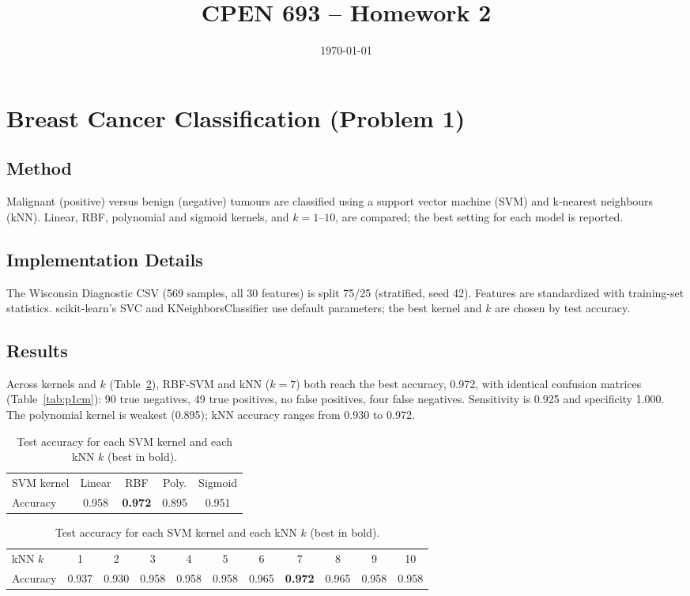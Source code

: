 \documentclass[11pt]{article}
\title{CPEN 693 -- Homework 2}
\author{}
\date{\today}
\begin{document}
\maketitle

\section{Breast Cancer Classification (Problem 1)}

\subsection*{Method}
Malignant (positive) versus benign (negative) tumours are classified using a support vector machine (SVM) and k-nearest neighbours (kNN). Linear, RBF, polynomial and sigmoid kernels, and $k=1$--$10$, are compared; the best setting for each model is reported.

\subsection*{Implementation Details}
The Wisconsin Diagnostic CSV (569 samples, all 30 features) is split 75/25 (stratified, seed 42). Features are standardized with training-set statistics. scikit-learn's SVC and KNeighborsClassifier use default parameters; the best kernel and $k$ are chosen by test accuracy.

\subsection*{Results}
Across kernels and $k$ (Table~\ref{tab:p1sweep}), RBF-SVM and kNN ($k=7$) both reach the best accuracy, 0.972, with identical confusion matrices (Table~\ref{tab:p1cm}): 90 true negatives, 49 true positives, no false positives, four false negatives. Sensitivity is 0.925 and specificity 1.000. The polynomial kernel is weakest (0.895); kNN accuracy ranges from 0.930 to 0.972.

\begin{table}[H]
\centering
\caption{Test accuracy for each SVM kernel and each kNN $k$ (best in bold).}
\label{tab:p1sweep}
\begin{tabular}{lcccc}
\toprule
SVM kernel & Linear & RBF & Poly. & Sigmoid\\
Accuracy & 0.958 & \textbf{0.972} & 0.895 & 0.951\\
\bottomrule
\end{tabular}

\vspace{6pt}
\begin{tabular}{lcccccccccc}
\toprule
kNN $k$ & 1 & 2 & 3 & 4 & 5 & 6 & 7 & 8 & 9 & 10\\
Accuracy & 0.937 & 0.930 & 0.958 & 0.958 & 0.958 & 0.965 & \textbf{0.972} & 0.965 & 0.958 & 0.958\\
\bottomrule
\end{tabular}
\end{table}
\end{document}
